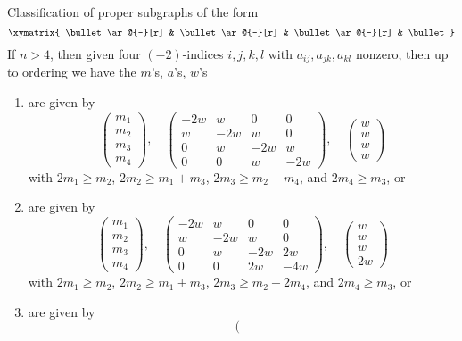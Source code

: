 \begin{lemma}
\label{lemma-four-by-four}
Classification of proper subgraphs of the form
$$
\xymatrix{
\bullet \ar@{-}[r] &
\bullet \ar@{-}[r] &
\bullet \ar@{-}[r] &
\bullet
}
$$
If $n > 4$, then given four $(-2)$-indices $i, j, k, l$
with $a_{ij}, a_{jk}, a_{kl}$ nonzero, then up
to ordering we have the $m$'s, $a$'s, $w$'s
\begin{enumerate}
\item
\label{item-A4}
are given by
$$
\left(
\begin{matrix}
m_1 \\
m_2 \\
m_3 \\
m_4
\end{matrix}
\right),
\quad
\left(
\begin{matrix}
-2w & w & 0 & 0 \\
w & -2w & w & 0 \\
0 & w & -2w & w \\
0 & 0 & w & -2w 
\end{matrix}
\right),
\quad
\left(
\begin{matrix}
w \\
w \\
w \\
w
\end{matrix}
\right)
$$
with $2m_1 \geq m_2$, $2m_2 \geq m_1 + m_3$, $2m_3 \geq m_2 + m_4$,
and $2m_4 \geq m_3$, or
\item
\label{item-C4}
are given by
$$
\left(
\begin{matrix}
m_1 \\
m_2 \\
m_3 \\
m_4
\end{matrix}
\right),
\quad
\left(
\begin{matrix}
-2w & w & 0 & 0 \\
w & -2w & w & 0 \\
0 & w & -2w & 2w \\
0 & 0 & 2w & -4w 
\end{matrix}
\right),
\quad
\left(
\begin{matrix}
w \\
w \\
w \\
2w
\end{matrix}
\right)
$$
with $2m_1 \geq m_2$, $2m_2 \geq m_1 + m_3$, $2m_3 \geq m_2 + 2m_4$,
and $2m_4 \geq m_3$, or
\item
\label{item-B4}
are given by
$$
\left(
\begin{matrix}

\end{matrix}$$
\end{enumerate}
\end{lemma}
